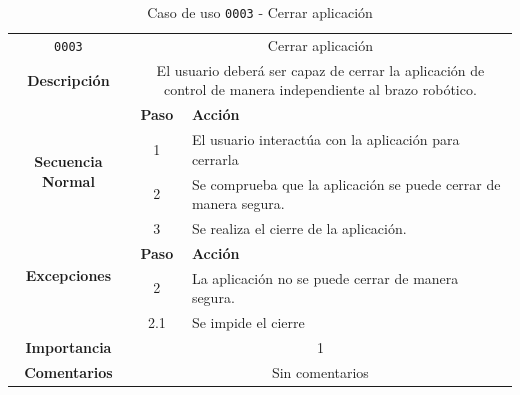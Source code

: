 \begin{table}[H]
    \centering
    \begin{tabularx}{\textwidth}{|c|c|X|}
        \cline{1-3}
        \texttt{0003}        & \multicolumn{2}{c|}{Cerrar aplicación}                                                       
        \\ \cline{1-3}
        \textbf{Descripción} & \multicolumn{2}{m{13cm}|}{El usuario deberá ser capaz de cerrar la aplicación de control de manera independiente al brazo robótico.}
        \\ \cline{1-3}
        \multirow{4}{*}{\textbf{Secuencia Normal}} & \textbf{Paso} & \textbf{Acción}
        \\ \cline{2-3}                    &   1  & El usuario interactúa con la aplicación para cerrarla
        \\ \cline{2-3}                    &   2  & Se comprueba que la  aplicación se puede cerrar de manera segura.
        \\ \cline{2-3}                    &   3  & Se realiza el cierre de la aplicación.
        \\ \cline{1-3}
        \multirow{2}{*}{\textbf{Excepciones}} & \textbf{Paso} & \textbf{Acción}
        \\ \cline{2-3}                        &  2  & La aplicación no se puede cerrar de manera segura.
        \\ \cline{2-3}                        & 2.1 & Se impide el cierre
        \\ \cline{1-3}
        \textbf{Importancia}                 & \multicolumn{2}{c|}{1}           
        \\ \cline{1-3}
        \textbf{Comentarios}                 & \multicolumn{2}{c|}{Sin comentarios}
        \\ \cline{1-3}
    \end{tabularx}
    \caption{Caso de uso \texttt{0003} - Cerrar aplicación}
    \label{tab:CU0003}
    \label{tab:caso_de_uso_cerrar_aplicación}
\end{table}


